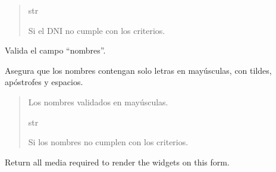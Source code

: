 \documentclass[letterpaper,10pt,spanish]{sphinxmanual}
\begin{document}
\begin{fulllineitems}
\begin{fulllineitems}
\begin{quote}
\begin{description}
\sphinxAtStartPar
str

\sphinxAtStartPar
{} \textendash{} Si el DNI no cumple con los criterios.

\end{description}\end{quote}

\end{fulllineitems}



\begin{fulllineitems}

\pysigstartsignatures
{}
\pysigstopsignatures
\sphinxAtStartPar
Valida el campo “nombres”.

\sphinxAtStartPar
Asegura que los nombres contengan solo letras en mayúsculas, con
tildes, apóstrofes y espacios.
\begin{quote}\begin{description}
\sphinxAtStartPar
Los nombres validados en mayúsculas.

\sphinxAtStartPar
str

\sphinxAtStartPar
{} \textendash{} Si los nombres no cumplen con los criterios.

\end{description}\end{quote}

\end{fulllineitems}



\begin{fulllineitems}

\pysigstartsignatures
{}
\pysigstopsignatures
\end{fulllineitems}



\begin{fulllineitems}

\pysigstartsignatures
{}
\pysigstopsignatures
\sphinxAtStartPar
Return all media required to render the widgets on this form.

\end{fulllineitems}


\end{fulllineitems}
\end{document}
